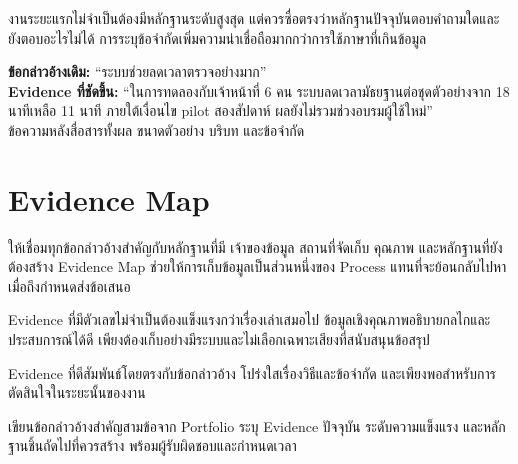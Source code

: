 งานระยะแรกไม่จำเป็นต้องมีหลักฐานระดับสูงสุด แต่ควรซื่อตรงว่าหลักฐานปัจจุบันตอบคำถามใดและยังตอบอะไรไม่ได้ การระบุข้อจำกัดเพิ่มความน่าเชื่อถือมากกว่าการใช้ภาษาที่เกินข้อมูล

\begin{examplebox}
\textbf{ข้อกล่าวอ้างเดิม:} \enquote{ระบบช่วยลดเวลาตรวจอย่างมาก}\\
\textbf{Evidence ที่ชัดขึ้น:} \enquote{ในการทดลองกับเจ้าหน้าที่ 6 คน ระบบลดเวลามัธยฐานต่อชุดตัวอย่างจาก 18 นาทีเหลือ 11 นาที ภายใต้เงื่อนไข pilot สองสัปดาห์ ผลยังไม่รวมช่วงอบรมผู้ใช้ใหม่}\\
ข้อความหลังสื่อสารทั้งผล ขนาดตัวอย่าง บริบท และข้อจำกัด
\end{examplebox}

\section{Evidence Map}
ให้เชื่อมทุกข้อกล่าวอ้างสำคัญกับหลักฐานที่มี เจ้าของข้อมูล สถานที่จัดเก็บ คุณภาพ และหลักฐานที่ยังต้องสร้าง Evidence Map ช่วยให้การเก็บข้อมูลเป็นส่วนหนึ่งของ Process แทนที่จะย้อนกลับไปหาเมื่อถึงกำหนดส่งข้อเสนอ


\begin{mentornote}
Evidence ที่มีตัวเลขไม่จำเป็นต้องแข็งแรงกว่าเรื่องเล่าเสมอไป ข้อมูลเชิงคุณภาพอธิบายกลไกและประสบการณ์ได้ดี เพียงต้องเก็บอย่างมีระบบและไม่เลือกเฉพาะเสียงที่สนับสนุนข้อสรุป
\end{mentornote}

\begin{keytakeaway}
Evidence ที่ดีสัมพันธ์โดยตรงกับข้อกล่าวอ้าง โปร่งใสเรื่องวิธีและข้อจำกัด และเพียงพอสำหรับการตัดสินใจในระยะนั้นของงาน
\end{keytakeaway}

\begin{reflection}
เขียนข้อกล่าวอ้างสำคัญสามข้อจาก Portfolio ระบุ Evidence ปัจจุบัน ระดับความแข็งแรง และหลักฐานชิ้นถัดไปที่ควรสร้าง พร้อมผู้รับผิดชอบและกำหนดเวลา
\blankline\blankline
\end{reflection}


